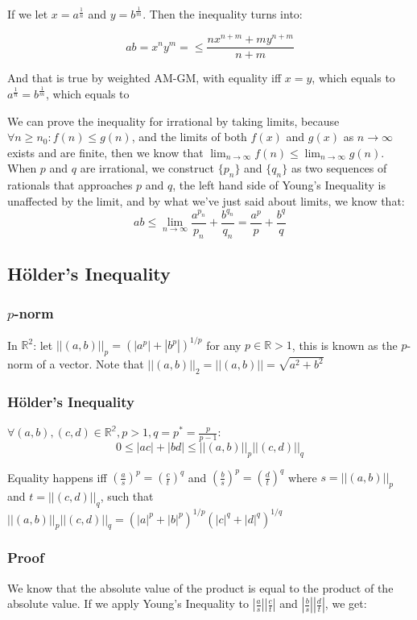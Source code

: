 \documentclass[11 pt, twoside]{article}
\begin{document}
If we let $x = a^{\frac{1}{n}}$ and $y = b^{\frac{1}{m}}$. Then the inequality
turns into:

$$ab = x^ny^m = \leq \frac{nx^{n + m} + my^{n + m}}{n + m}$$

And that is true by weighted AM-GM, with equality iff $x = y$, which equals to
$a^{\frac{1}{n}} = b^{\frac{1}{m}}$, which equals to 

We can prove the inequality for irrational by taking limits, because
$\forall n \geq n_0: f(n) \leq g(n)$, and the limits of both $f(x)$ and $g(x)$ as
$n\to\infty$ exists and are finite, then we know that $\lim_{n\to\infty}f(n)
\leq \lim_{n\to\infty} g(n)$. When $p$ and $q$ are irrational, we construct
$\{p_n\}$ and $\{q_n\}$ as two sequences of rationals that approaches $p$ and
$q$, the left hand side of Young's Inequality is unaffected by the limit, and by
what we've just said about limits, we know that:
$$ab \leq \lim_{n\to\infty} \frac{a^{p_n}}{p_n} + \frac{b^{q_n}}{q_n} =
\frac{a^p}{p} + \frac{b^q}{q}$$

\subsection{H\"{o}lder's Inequality}
\subsubsection{$p$-norm}
In $\mathbb{R}^2$: let $||(a, b)||_p = (|a^p| + |b^p|)^{1/p}$ for any $p \in
\mathbb{R} > 1$, this is known as the $p$-norm of a vector. Note that $||(a,
b)||_2 = ||(a, b)|| = \sqrt{a^2 + b^2}$

\subsubsection{H\"{o}lder's Inequality}
$\forall (a, b), (c, d) \in \mathbb{R^2}, p > 1, q = p^* = \frac{p}{p-1}$:
$$ 0 \leq |ac| + |bd| \leq ||(a, b)||_p||(c, d)||_q$$

Equality happens iff $(\frac{a}{s})^p = (\frac{c}{t})^q$ and $(\frac{b}{s})^p =
(\frac{d}{t})^q$ where $s = ||(a, b)||_p$ and $t = ||(c, d)||_q$, such that $||(a, b)||_p||(c, d)||_q = (|a|^p + |b|^p)^{1/p}(|c|^q + |d|^q)^{1/q}$

\subsubsection{Proof}
We know that the absolute value of the product is equal to the product of the
absolute value. If we apply Young's Inequality to $|\frac{a}{s}||\frac{c}{t}|$
and $|\frac{b}{s}||\frac{d}{t}|$, we get:
\end{document}
